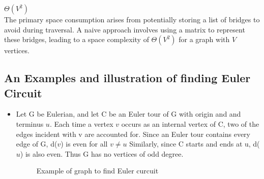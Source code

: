 \documentclass[14pt, times, a4paper]{extarticle}
\begin{document}
\( \Theta(V^2) \)\\
The primary space consumption arises from potentially storing a list of bridges to avoid during traversal. A naive approach involves using a matrix to represent these bridges, leading to a space complexity of \( \Theta(V^2) \) for a graph with \( V \) vertices.
\subsection{An Examples and illustration of finding Euler Circuit}
\begin{itemize}
  \item Let G be Eulerian, and let C be an Euler tour of G with origin and and terminus $u$. Each time a vertex $v$ occurs as an internal vertex of C, two of the edges incident with v are accounted for. Since an Euler tour contains every edge of G, d($v$) is even for all $v \neq u$ Similarly, since C starts and ends at u, d($u$) is also even. Thus G has no vertices of odd degree.

    \begin{center}
    \begin{figure}[H]
        \centering
{}
        \caption{Example of graph to find Euler curcuit}
        \label{fig:example-euler-find}
    \end{figure}
\end{center}
    
\end{itemize}
\end{document}
